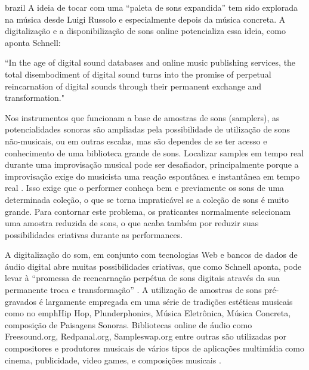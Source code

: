 \begin{otherlanguage*}{brazil}
A ideia de tocar com uma ``paleta de sons expandida'' tem sido explorada na música desde Luigi Russolo  \cite{Merz2013} e especialmente depois da música concreta. A digitalização e a disponibilização de sons online potencializa essa ideia, como aponta Schnell:
\begin{citacao}
``In the age of digital sound databases and online music publishing services, the total disembodiment of digital sound turns into the promise of perpetual reincarnation of digital sounds through their permanent exchange and transformation."\cite{Schnell2013}
\end{citacao}

Nos instrumentos que funcionam a base de amostras de sons (samplers), as potencialidades sonoras são ampliadas pela possibilidade de utilização de sons não-musicais, ou em outras escalas, mas são dependes de se ter acesso e conhecimento de uma biblioteca grande de sons. Localizar samples em tempo real durante uma improvisação musical pode ser desafiador\cite{Xambo2018}, principalmente porque a improvisação exige do musicista uma reação espontânea e instantânea em tempo real \cite{canonne2011model}. Isso exige que o performer conheça bem e previamente os sons de uma determinada coleção, o que se torna impraticável se a coleção de sons é muito grande. Para contornar este problema, os praticantes normalmente selecionam uma amostra reduzida de sons, o que acaba também por reduzir suas possibilidades criativas durante as performances.

A digitalização do som, em conjunto com tecnologias Web e bancos de dados de áudio digital abre muitas possibilidades criativas, que como Schnell aponta, pode levar à ``promessa de reencarnação perpétua de sons digitais através da sua permanente troca e transformação'' \cite{Schnell2013}. A utilização de amostras de sons pré-gravados é largamente empregada em uma série de tradições estéticas musicais como no emph{Hip Hop, Plunderphonics, Música Eletrônica, Música Concreta, composição de Paisagens Sonoras}. Bibliotecas online de áudio como Freesound.org, Redpanal.org, Sampleswap.org entre outras são utilizadas por compositores e produtores musicais de vários tipos de aplicações multimídia como cinema, publicidade, video games, e composições musicais \cite{Roma2013}. 


\end{otherlanguage*}
